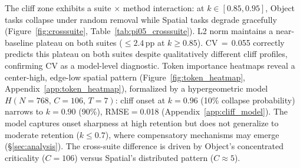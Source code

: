 The cliff zone exhibits a suite $\times$ method interaction: at $k \in [0.85, 0.95]$, Object tasks collapse under random removal while Spatial tasks degrade gracefully (Figure~\ref{fig:crosssuite}, Table~\ref{tab:pi05_crosssuite}). L2 norm maintains a near-baseline plateau on both suites ($\leq 2.4$\,pp at $k \geq 0.85$). CV$\,{=}\,$0.055 correctly predicts this plateau on both suites despite qualitatively different cliff profiles, confirming CV as a model-level diagnostic. Token importance heatmaps reveal a center-high, edge-low spatial pattern (Figure~\ref{fig:token_heatmap}, Appendix~\ref{app:token_heatmap}), formalized by a hypergeometric model $H(N{=}768,\, C{=}106,\, T{=}7)$: cliff onset at $k{=}0.96$ (10\% collapse probability) narrows to $k{=}0.90$ (90\%), RMSE${=}$0.018 (Appendix~\ref{app:cliff_model}). The model captures onset sharpness at high retention but does not generalize to moderate retention ($k \leq 0.7$), where compensatory mechanisms may emerge (\S\ref{sec:analysis}). The cross-suite difference is driven by Object's concentrated criticality ($C{=}106$) versus Spatial's distributed pattern ($C \approx 5$).